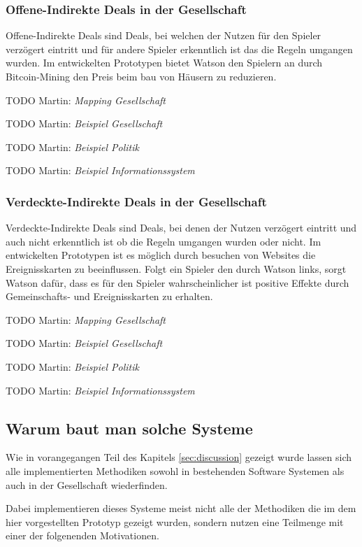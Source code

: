 \documentclass[german]{cgspaper} %
\newcommand{\todo}[1]{\textit{#1}}
\newcommand{\Martin}[1]{\textcolor{colorMartin}{TODO Martin:} \todo{#1} }
\begin{document}
\subsubsection{Offene-Indirekte Deals in der Gesellschaft}

Offene-Indirekte Deals sind Deals, bei welchen der Nutzen für den Spieler verzögert eintritt und für andere Spieler erkenntlich ist das die Regeln umgangen wurden.
Im entwickelten Prototypen bietet Watson den Spielern an durch Bitcoin-Mining den Preis beim bau von Häusern zu reduzieren.

\Martin{Mapping Gesellschaft}

\Martin{Beispiel Gesellschaft}

\Martin{Beispiel Politik}

\Martin{Beispiel Informationssystem}

\subsubsection{Verdeckte-Indirekte Deals in der Gesellschaft}

Verdeckte-Indirekte Deals sind Deals, bei denen der Nutzen verzögert eintritt und auch nicht erkenntlich ist ob die Regeln umgangen wurden oder nicht.
Im entwickelten Prototypen ist es möglich durch besuchen von Websites die Ereignisskarten zu beeinflussen.
Folgt ein Spieler den durch Watson links, sorgt Watson dafür, dass es für den Spieler wahrscheinlicher ist positive Effekte durch Gemeinschafts- und Ereignisskarten zu erhalten.

\Martin{Mapping Gesellschaft}

\Martin{Beispiel Gesellschaft}

\Martin{Beispiel Politik}

\Martin{Beispiel Informationssystem}

\subsection{Warum baut man solche Systeme}

Wie in vorangegangen Teil des Kapitels \ref{sec:discussion} gezeigt wurde lassen sich alle implementierten Methodiken sowohl in bestehenden Software Systemen als auch in der Gesellschaft wiederfinden.

Dabei implementieren dieses Systeme meist nicht alle der Methodiken die im dem hier vorgestellten Prototyp gezeigt wurden, sondern nutzen eine Teilmenge mit einer der folgenenden Motivationen.
\end{document}
